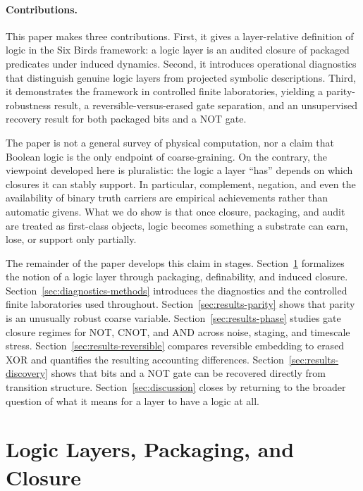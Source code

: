 \documentclass[11pt]{article}
\theoremstyle{definition}
\begin{document}
\paragraph{Contributions.}
This paper makes three contributions. First, it gives a layer-relative definition of logic in the Six Birds framework: a logic layer is an audited closure of packaged predicates under induced dynamics. Second, it introduces operational diagnostics that distinguish genuine logic layers from projected symbolic descriptions. Third, it demonstrates the framework in controlled finite laboratories, yielding a parity-robustness result, a reversible-versus-erased gate separation, and an unsupervised recovery result for both packaged bits and a NOT gate.

The paper is not a general survey of physical computation, nor a claim that Boolean logic is the only endpoint of coarse-graining. On the contrary, the viewpoint developed here is pluralistic: the logic a layer ``has'' depends on which closures it can stably support. In particular, complement, negation, and even the availability of binary truth carriers are empirical achievements rather than automatic givens. What we do show is that once closure, packaging, and audit are treated as first-class objects, logic becomes something a substrate can earn, lose, or support only partially.

The remainder of the paper develops this claim in stages. Section~\ref{sec:framework} formalizes the notion of a logic layer through packaging, definability, and induced closure. Section~\ref{sec:diagnostics-methods} introduces the diagnostics and the controlled finite laboratories used throughout. Section~\ref{sec:results-parity} shows that parity is an unusually robust coarse variable. Section~\ref{sec:results-phase} studies gate closure regimes for NOT, CNOT, and AND across noise, staging, and timescale stress. Section~\ref{sec:results-reversible} compares reversible embedding to erased XOR and quantifies the resulting accounting differences. Section~\ref{sec:results-discovery} shows that bits and a NOT gate can be recovered directly from transition structure. Section~\ref{sec:discussion} closes by returning to the broader question of what it means for a layer to have a logic at all.
 \section{Logic Layers, Packaging, and Closure}
\label{sec:framework}
\end{document}
